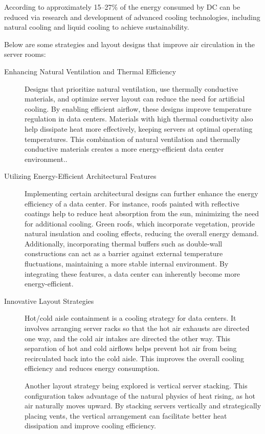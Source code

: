 \documentclass[
  a4paper,  %
  twoside,  %
  bibliography=totoc,
  headsepline,
  cleardoublepage=empty,
  parskip=half,
  draft=false
]{scrbook}
\begin{document}
According to \cite{ZHU2023104322} approximately 15–27\% of the energy consumed by DC can be reduced via research and development of advanced cooling technologies, including natural cooling and liquid cooling to achieve sustainability.

Below are some strategies and layout designs that improve air circulation in the server rooms:
\begin{description}
	
	\item[Enhancing Natural Ventilation and Thermal Efficiency]
	Designs that prioritize natural ventilation, use thermally conductive materials, and optimize server layout can reduce the need for artificial cooling. By enabling efficient airflow, these designs improve temperature regulation in data centers. Materials with high thermal conductivity also help dissipate heat more effectively, keeping servers at optimal operating temperatures. This combination of natural ventilation and thermally conductive materials creates a more energy-efficient data center environment.\cite{zhang2021optimization}\cite{stavreva2023best}.

	\item[Utilizing Energy-Efficient Architectural Features]
	Implementing certain architectural designs can further enhance the energy efficiency of a data center\cite{moazamigoodarzi2019influence}. For instance, roofs painted with reflective coatings help to reduce heat absorption from the sun, minimizing the need for additional cooling\cite{akbari2003measured}. Green roofs, which incorporate vegetation, provide natural insulation and cooling effects, reducing the overall energy demand\cite{susca2011positive}. Additionally, incorporating thermal buffers such as double-wall constructions can act as a barrier against external temperature fluctuations, maintaining a more stable internal environment. By integrating these features, a data center can inherently become more energy-efficient\cite{ewim2023impact}.

	\item[Innovative Layout Strategies]
	Hot/cold aisle containment is a cooling strategy for data centers. It involves arranging server racks so that the hot air exhausts are directed one way, and the cold air intakes are directed the other way. This separation of hot and cold airflows helps prevent hot air from being recirculated back into the cold aisle. This improves the overall cooling efficiency and reduces energy consumption\cite{jin2020case}\cite{jin2019effects}.
	
	Another layout strategy being explored is vertical server stacking. This configuration takes advantage of the natural physics of heat rising, as hot air naturally moves upward. By stacking servers vertically and strategically placing vents, the vertical arrangement can facilitate better heat dissipation and improve cooling efficiency\cite{jin2020case}\cite{jin2019effects}.

\end{description}
\end{document}
